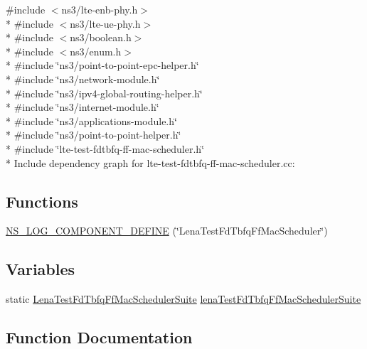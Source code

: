 {\ttfamily \#include $<$ns3/lte-\/enb-\/phy.\+h$>$}\\*
{\ttfamily \#include $<$ns3/lte-\/ue-\/phy.\+h$>$}\\*
{\ttfamily \#include $<$ns3/boolean.\+h$>$}\\*
{\ttfamily \#include $<$ns3/enum.\+h$>$}\\*
{\ttfamily \#include \char`\"{}ns3/point-\/to-\/point-\/epc-\/helper.\+h\char`\"{}}\\*
{\ttfamily \#include \char`\"{}ns3/network-\/module.\+h\char`\"{}}\\*
{\ttfamily \#include \char`\"{}ns3/ipv4-\/global-\/routing-\/helper.\+h\char`\"{}}\\*
{\ttfamily \#include \char`\"{}ns3/internet-\/module.\+h\char`\"{}}\\*
{\ttfamily \#include \char`\"{}ns3/applications-\/module.\+h\char`\"{}}\\*
{\ttfamily \#include \char`\"{}ns3/point-\/to-\/point-\/helper.\+h\char`\"{}}\\*
{\ttfamily \#include \char`\"{}lte-\/test-\/fdtbfq-\/ff-\/mac-\/scheduler.\+h\char`\"{}}\\*
Include dependency graph for lte-\/test-\/fdtbfq-\/ff-\/mac-\/scheduler.cc\+:
\subsection*{Functions}
\begin{DoxyCompactItemize}
\item 
\hyperlink{lte-test-fdtbfq-ff-mac-scheduler_8cc_aa02462ff1b81234f4738421e0a715829}{N\+S\+\_\+\+L\+O\+G\+\_\+\+C\+O\+M\+P\+O\+N\+E\+N\+T\+\_\+\+D\+E\+F\+I\+NE} (\char`\"{}Lena\+Test\+Fd\+Tbfq\+Ff\+Mac\+Scheduler\char`\"{})
\end{DoxyCompactItemize}
\subsection*{Variables}
\begin{DoxyCompactItemize}
\item 
static \hyperlink{classLenaTestFdTbfqFfMacSchedulerSuite}{Lena\+Test\+Fd\+Tbfq\+Ff\+Mac\+Scheduler\+Suite} \hyperlink{lte-test-fdtbfq-ff-mac-scheduler_8cc_a456b2f9213f3430cb439a65951d5dc32}{lena\+Test\+Fd\+Tbfq\+Ff\+Mac\+Scheduler\+Suite}
\end{DoxyCompactItemize}


\subsection{Function Documentation}
